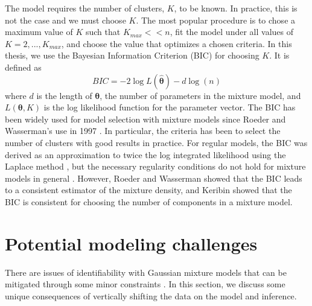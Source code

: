 \documentclass[12pt]{article}
\newcommand{\bs}[0]{\boldsymbol}
\begin{document}
The model requires the number of clusters, $K$, to be known. In practice, this is not the case and we must choose $K$. The most popular procedure is to chose a maximum value of $K$ such that $K_{max}<<n$, fit the model under all values of $K=2,...,K_{max}$, and choose the value that optimizes a chosen criteria. In this thesis, we use the Bayesian Information Criterion (BIC) \cite{schwarz1978} for choosing $K$. It is defined as
$$BIC = -2\log L(\hat{\bs\theta})- d\log(n)$$
where $d$ is the length of $\bs\theta$, the number of parameters in the mixture model, and $L(\bs\theta,K)$ is the log likelihood function for the parameter vector. The BIC has been widely used for model selection with mixture models since Roeder and Wasserman's use in 1997 \cite{roeder1997}. In particular, the criteria has been to select the number of clusters \cite{dasgupta1999,fraley1999} with good results in practice. For regular models, the BIC was derived as an approximation to twice the log integrated likelihood using the Laplace method \cite{tierney1986}, but the necessary regularity conditions do not hold for mixture models in general \cite{aitkin1985}. However, Roeder and Wasserman \cite{roeder1997} showed that the BIC leads to a consistent estimator of the mixture density, and Keribin \cite{keribin2000} showed that the BIC is consistent for choosing the number of components in a mixture model.

\section{Potential modeling challenges}
There are issues of identifiability with Gaussian mixture models that can be mitigated through some minor constraints \cite{mclachlan2000}. In this section, we discuss some unique consequences of vertically shifting the data on the model and inference.
\end{document}
